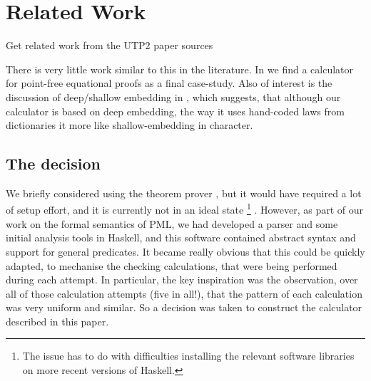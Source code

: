 \section{Related Work}\label{sec:Related}

Get related work from the UTP2 paper sources


There is very little work similar to this in the literature.
In \cite{Bird14} we find a calculator
for point-free equational proofs as a final case-study.
Also of interest is the discussion of deep/shallow embedding
in \cite{Gibbons:2014:FDS},
which suggests, that although our calculator is based on deep embedding,
the way it uses hand-coded laws from dictionaries
it more like shallow-embedding in character.



\subsection{The decision}

We briefly considered using the  theorem prover
\cite{DBLP:conf/utp/Butterfield10,DBLP:conf/utp/Butterfield12},
but it would have required a lot of setup effort,
and it is currently not in an ideal state%
\footnote{The issue has to do with difficulties installing
the relevant software libraries
on more recent versions of Haskell.}
.
However, as part of our work on the formal semantics of PML,
we had developed a parser and some initial analysis tools
in Haskell\cite{Haskell2010},
and this software contained abstract syntax and support
for general predicates.
It became really obvious that this could be quickly adapted,
to mechanise the checking calculations, that were being performed
during each attempt.
In particular,
the key inspiration was the observation,
over all of those calculation attempts (five in all!),
that the pattern of each calculation was very uniform and similar.
So a decision was taken to construct the calculator described in this paper.
